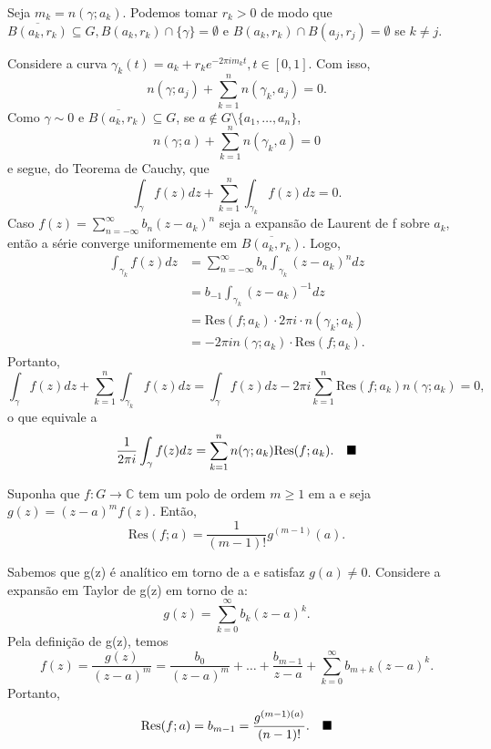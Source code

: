 \documentclass[complex.tex]{subfiles}
\begin{document}
\begin{proof*}
	Seja \(m_{k} = n(\gamma ; a_{k}).\) Podemos tomar \(r_{k}>0\) de modo que \(\overline{B(a_{k}, r_{k})}\subseteq G, B(a_{k}, r_{k})\cap\{\gamma \}=\emptyset \) e
	\(B(a_{k}, r_{k})\cap B(a_{j}, r_{j}) = \emptyset \) se \(k\neq j\).

	Considere a curva \(\gamma_{k}(t) = a_{k} + r_{k}e^{-2\pi i m_{k}t},t\in[0, 1].\) Com isso,
	\[
		n(\gamma ; a_{j}) + \sum\limits_{k=1}^{n}n(\gamma_{k}, a_{j}) = 0.
	\]
	Como \(\gamma \sim 0\) e \(\overline{B(a_{k}, r_{k})}\subseteq G\), se \(a\not\in G\setminus{\{a_{1},\dotsc ,a_{n}\}}\),
	\[
		n(\gamma ; a) + \sum\limits_{k=1}^{n}n(\gamma_{k}, a) = 0
	\]
	e segue, do Teorema de Cauchy, que
	\[
		\int_{\gamma }^{}f(z)dz + \sum\limits_{k=1}^{n}\int_{\gamma_{k}}^{}f(z)dz = 0.
	\]
	Caso \(f(z) = \sum\limits_{n=-\infty}^{\infty}b_{n}(z-a_{k})^{n}\) seja a expansão de Laurent de f sobre \(a_{k}\), então a série converge uniformemente
	em \(\overline{B(a_{k}, r_{k})}.\) Logo,
	\begin{align*}
		\int_{\gamma_{k}}^{}f(z)dz & = \sum\limits_{n=-\infty}^{\infty}b_{n}\int_{\gamma_{k}}^{}(z-a_{k})^{n}dz \\
		                           & = b_{-1}\int_{\gamma_{k}}^{}(z-a_{k})^{-1}dz                               \\
		                           & = \mathrm{Res}(f; a_{k})\cdot 2\pi i \cdot n(\gamma_{k}; a_{k})            \\
		                           & = -2\pi i n(\gamma ; a_{k})\cdot \mathrm{Res}(f; a_{k}).
	\end{align*}
	Portanto,
	\[
		\int_{\gamma }^{}f(z)dz + \sum\limits_{k=1}^{n}\int_{\gamma_{k}}^{}f(z)dz = \int_{\gamma }^{}f(z)dz - 2\pi i \sum\limits_{k=1}^{n}\mathrm{Res}(f; a_{k})n(\gamma ; a_{k}) = 0,
	\]
	o que equivale a
	\[
		\frac{1}{2\pi i}\int_{\gamma }^{}f(z)dz = \sum\limits_{k=1}^{n}n(\gamma ; a_{k})\mathrm{Res}(f; a_{k}).\quad \text{$\blacksquare$}
	\]
\end{proof*}
\begin{prop*}
	Suponha que \(f:G\rightarrow \mathbb{C}\) tem um polo de ordem \(m \geq 1\) em a e seja \(g(z) = (z-a)^{m}f(z).\) Então,
	\[
		\mathrm{Res}(f; a) = \frac{1}{(m-1)!}g^{(m-1)}(a).
	\]
\end{prop*}
\begin{proof*}
	Sabemos que g(z) é analítico em torno de a e satisfaz \(g(a)\neq 0.\) Considere a expansão em Taylor de g(z) em torno de a:
	\[
		g(z) = \sum\limits_{k=0}^{\infty}b_{k}(z-a)^{k}.
	\]
	Pela definição de g(z), temos
	\[
		f(z) = \frac{g(z)}{(z-a)^{m}} = \frac{b_{0}}{(z-a)^{m}} + \dotsc + \frac{b_{m-1}}{z-a} + \sum\limits_{k=0}^{\infty}b_{m+k}(z-a)^{k}.
	\]
	Portanto,
	\[
		\mathrm{Res}(f; a) = b_{m-1} = \frac{g^{(m-1)(a)}}{(n-1)!}.\quad \text{$\blacksquare$}
	\]
\end{proof*}
\end{document}
